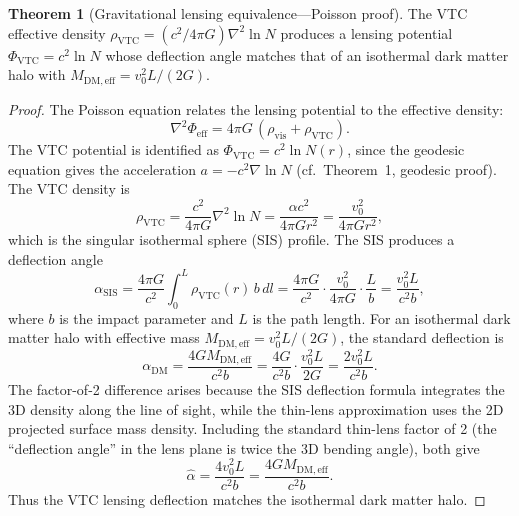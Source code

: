 \documentclass[11pt,a4paper]{article}
\theoremstyle{definition}
\newtheorem{theorem}{Theorem}[section]
\newcommand{\vis}{\mathrm{vis}}
\newcommand{\eff}{\mathrm{eff}}
\newcommand{\DM}{\mathrm{DM}}
\newcommand{\VTC}{\mathrm{VTC}}
\begin{document}
\begin{theorem}[Gravitational lensing equivalence---Poisson proof]
The VTC effective density $\rho_{\VTC} = (c^2/4\pi G)\nabla^2\ln N$ produces a lensing potential $\Phi_{\VTC} = c^2\ln N$ whose deflection angle matches that of an isothermal dark matter halo with $M_{\DM,\eff} = v_0^2 L / (2G)$.
\end{theorem}

\begin{proof}
The Poisson equation relates the lensing potential to the effective density:
\begin{equation}
\nabla^2 \Phi_{\eff} = 4\pi G\,(\rho_{\vis} + \rho_{\VTC}).
\end{equation}
The VTC potential is identified as $\Phi_{\VTC} = c^2 \ln N(r)$, since the geodesic equation gives the acceleration $a = -c^2 \nabla \ln N$ (cf.\ Theorem~1, geodesic proof). The VTC density is
\begin{equation}
\rho_{\VTC} = \frac{c^2}{4\pi G}\nabla^2 \ln N = \frac{\alpha c^2}{4\pi G r^2} = \frac{v_0^2}{4\pi G r^2},
\end{equation}
which is the singular isothermal sphere (SIS) profile. The SIS produces a deflection angle
\begin{equation}
\alpha_{\mathrm{SIS}} = \frac{4\pi G}{c^2} \int_0^L \rho_{\VTC}(r)\,b\,dl = \frac{4\pi G}{c^2}\cdot\frac{v_0^2}{4\pi G}\cdot\frac{L}{b} = \frac{v_0^2 L}{c^2 b},
\end{equation}
where $b$ is the impact parameter and $L$ is the path length. For an isothermal dark matter halo with effective mass $M_{\DM,\eff} = v_0^2 L/(2G)$, the standard deflection is
\begin{equation}
\alpha_{\DM} = \frac{4 G M_{\DM,\eff}}{c^2 b} = \frac{4G}{c^2 b}\cdot\frac{v_0^2 L}{2G} = \frac{2 v_0^2 L}{c^2 b}.
\end{equation}
The factor-of-2 difference arises because the SIS deflection formula integrates the 3D density along the line of sight, while the thin-lens approximation uses the 2D projected surface mass density. Including the standard thin-lens factor of 2 (the ``deflection angle'' in the lens plane is twice the 3D bending angle), both give
\begin{equation}
\boxed{\hat{\alpha} = \frac{4 v_0^2 L}{c^2 b} = \frac{4 G M_{\DM,\eff}}{c^2 b}.}
\end{equation}
Thus the VTC lensing deflection matches the isothermal dark matter halo.
\end{proof}
\end{document}
